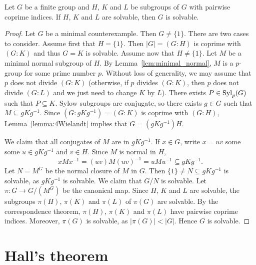 \begin{theorem}
	\label{theorem:Wielandt:solvable}
	Let $G$ be a finite group and $H$, $K$ and $L$ be 
        subgroups of $G$ with pairwise coprime indices. 
        If $H$, $K$ and $L$ are solvable, then $G$ is 
	solvable.
\end{theorem}

\begin{proof}
    Let $G$ be a minimal counterexample. Then $G\ne\{1\}$. 
    There are two cases to consider. 
    Assume first that $H=\{1\}$. Then 
    $|G|=(G:H)$ is coprime with $(G:K)$ and thus $G=K$ is solvable. 
    Assume now that  
    $H\ne \{1\}$. Let $M$ be a minimal normal subgroup of $H$. By Lemma~\ref{lem:minimal_normal}, 
    $M$ is a $p$-group for some prime number $p$. 
    Without loss of generality, we may assume that $p$ does not divide $(G:K)$ (otherwise, if $p$ divides $(G:K)$, then 
    $p$ does not divide $(G:L)$ and we just need to change $K$ by $L$). 
    There exists $P\in\mathrm{Syl}_p(G)$ such that $P\subseteq K$. Sylow subgroups are conjugate, so there exists 
    $g\in G$ such that $M\subseteq
	gKg^{-1}$. Since $(G:gKg^{-1})=(G:K)$ is coprime with $(G:H)$, Lemma~\ref{lemma:4Wielandt} implies that
    $G=(gKg^{-1})H$. 
	
    We claim that all conjugates of $M$ are in $gKg^{-1}$. 
    If $x\in G$, write $x=uv$ some some $u\in 
	gKg^{-1}$ and $v\in H$. Since $M$ is normal in $H$, 
	\[
	xMx^{-1}=(uv)M(uv)^{-1}=uMu^{-1}\subseteq gKg^{-1}.
	\]
        Let $N=M^G$ be the normal closure of $M$ in $G$. 
	Then $\{1\}\ne N\subseteq gKg^{-1}$ is solvable, as $gKg^{-1}$ is 
	solvable. We claim that $G/N$ is solvable. Let 
         $\pi\colon G\to G/(M^G)$ be the canonical map. Since $H$, $K$ and $L$ are solvable, 
    the subgroups $\pi(H)$, $\pi(K)$ and $\pi(L)$ of $\pi(G)$ are solvable. By the correspondence theorem, $\pi(H)$, $\pi(K)$ and $\pi(L)$ have pairwise coprime indices. Moreover, $\pi(G)$ is solvable, as
    $|\pi(G)|<|G|$.  
        Hence 
        $G$ is solvable. 
\end{proof}

\section{Hall's theorem}

